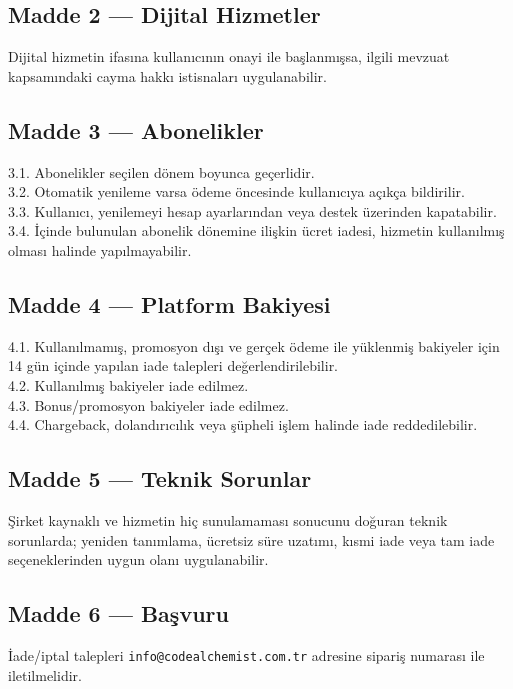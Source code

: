\documentclass[12pt,a4paper]{article}
\begin{document}
\subsection*{Madde 2 --- Dijital Hizmetler}
Dijital hizmetin ifas{\i}na kullan{\i}c{\i}n{\i}n onayi ile ba\c{s}lanm{\i}\c{s}sa, ilgili mevzuat
kapsam{\i}ndaki cayma hakk{\i} istisnalar{\i} uygulanabilir.

\subsection*{Madde 3 --- Abonelikler}
3.1. Abonelikler se\c{c}ilen d\"{o}nem boyunca ge\c{c}erlidir.\\
3.2. Otomatik yenileme varsa \"{o}deme \"{o}ncesinde kullan{\i}c{\i}ya a\c{c}{\i}k\c{c}a bildirilir.\\
3.3. Kullan{\i}c{\i}, yenilemeyi hesap ayarlar{\i}ndan veya destek \"{u}zerinden kapatabilir.\\
3.4. \.{I}\c{c}inde bulunulan abonelik d\"{o}nemine ili\c{s}kin \"{u}cret iadesi, hizmetin kullan{\i}lm{\i}\c{s}
olmas{\i} halinde yap{\i}lmayabilir.

\subsection*{Madde 4 --- Platform Bakiyesi}
4.1. Kullan{\i}lmam{\i}\c{s}, promosyon d{\i}\c{s}{\i} ve ger\c{c}ek \"{o}deme ile y\"{u}klenmi\c{s} bakiyeler i\c{c}in
14 g\"{u}n i\c{c}inde yap{\i}lan iade talepleri de\u{g}erlendirilebilir.\\
4.2. Kullan{\i}lm{\i}\c{s} bakiyeler iade edilmez.\\
4.3. Bonus/promosyon bakiyeler iade edilmez.\\
4.4. Chargeback, doland{\i}r{\i}c{\i}l{\i}k veya \c{s}\"{u}pheli i\c{s}lem halinde iade reddedilebilir.

\subsection*{Madde 5 --- Teknik Sorunlar}
\c{S}irket kaynakl{\i} ve hizmetin hi\c{c} sunulamamas{\i} sonucunu do\u{g}uran teknik sorunlarda;
yeniden tan{\i}mlama, \"{u}cretsiz s\"{u}re uzat{\i}m{\i}, k{\i}smi iade veya tam iade se\c{c}eneklerinden
uygun olan{\i} uygulanabilir.

\subsection*{Madde 6 --- Ba\c{s}vuru}
\.{I}ade/iptal talepleri \texttt{info@codealchemist.com.tr} adresine sipari\c{s} numaras{\i} ile
iletilmelidir.
\end{document}
